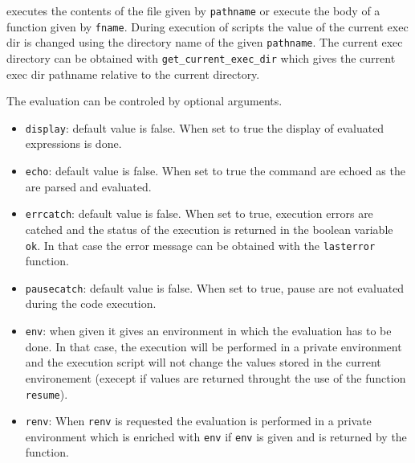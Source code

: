 \begin{mandescription}
  executes the contents of the file given by \verb!pathname! or execute 
  the body of a function given by \verb!fname!. 
  During execution of scripts the value of the current exec dir is 
  changed using the directory name of the given \verb!pathname!. 
  The current exec directory can be obtained with \verb!get_current_exec_dir! 
  which gives the current exec dir pathname relative to the current directory. 

  The evaluation can be controled by optional arguments. 
  
  \begin{itemize}
    \item \verb!display!: default value is false. When set to true the 
      display of evaluated expressions is done. 
    \item \verb!echo!: default value is false. When set to true the 
      command are echoed as the are parsed and evaluated. 
    \item \verb!errcatch!: default value is false. When set to true, 
      execution errors are catched and the status of the execution is 
      returned in the boolean variable \verb!ok!. In that case the 
      error message can be obtained with the \verb!lasterror! function.
    \item \verb!pausecatch!: default value is false. When set to true, 
      pause are not evaluated during the code execution. 
    \item \verb!env!: when given it gives an environment in which the 
      evaluation has to be done. In that case, the execution will 
      be performed in a private environment and the execution script 
      will not change the values stored in the current environement 
      (execept if values are returned throught the use of the function
      \verb!resume!).
    \item \verb!renv!: When \verb!renv! is requested the evaluation 
      is performed in a private environment which is enriched with 
      \verb!env! if \verb!env! is given and is returned by the function.
  \end{itemize}
\end{mandescription}
\begin{manseealso}
\end{manseealso}
